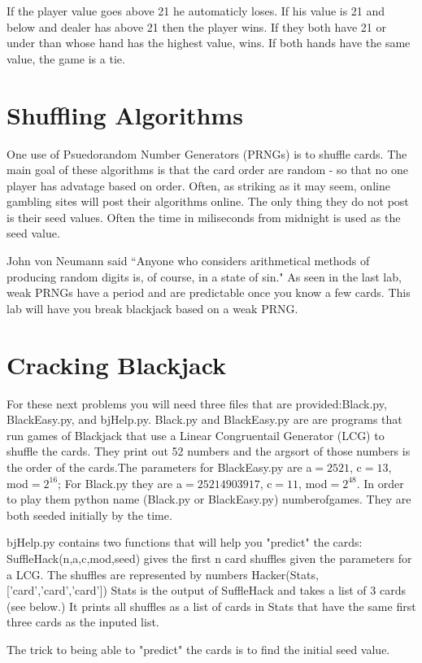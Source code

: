 If the player value goes above 21 he automaticly loses. If his value is 21 and below and dealer has above 21 then the player wins. If they both have 21 or under than whose hand has the highest value, wins. If both hands have the same value, the game is a tie.

\section*{Shuffling Algorithms}

One use of Psuedorandom Number Generators (PRNGs) is to shuffle cards. The main goal of these algorithms is that the card order are random - so that no one player has advatage based on order. Often, as striking as it may seem, online gambling sites will post their algorithms online. The only thing they do not post is their seed values. Often the time in miliseconds from midnight is used as the seed value.

John von Neumann said ``Anyone who considers arithmetical methods of producing random digits is, of course, in a state of sin." As seen in the last lab, weak PRNGs have a period and are predictable once you know a few cards. This lab will have you break blackjack based on a weak PRNG.

\section*{Cracking Blackjack}
For these next problems you will need three files that are provided:Black.py, BlackEasy.py, and bjHelp.py.  Black.py and BlackEasy.py are are programs that run games of Blackjack that use a Linear Congruentail Generator (LCG) to shuffle the cards. They print out 52 numbers and the argsort of those numbers is the order of the cards.The parameters for BlackEasy.py are a$=2521$, c$=13$, mod$=2^{16}$; For Black.py they are a$=25214903917$, c$=11$, mod$=2^{48}$. In order to play them python name (Black.py or BlackEasy.py) numberofgames. They are both seeded initially by the time.

bjHelp.py contains two functions that will help you "predict" the cards:
SuffleHack(n,a,c,mod,seed) gives the first n card shuffles given the parameters for a LCG. The shuffles are represented by numbers 
Hacker(Stats,['card','card','card']) Stats is the output of SuffleHack and takes a list of 3 cards (see below.) It prints all shuffles as a list of cards in Stats that have the same first three cards as the inputed list.

The trick to being able to "predict" the cards is to find the initial seed value.

